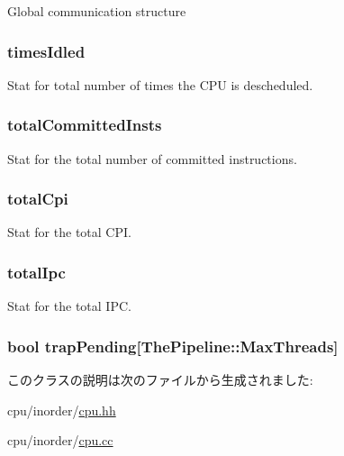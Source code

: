 \label{classInOrderCPU_ad72b6568a4a40f54d071c31bef16bf2e}
Global communication structure \hypertarget{classInOrderCPU_a174dbfb3c7b892914a54cec44ed2eeaf}{
\subsubsection[{timesIdled}]{ {\bf timesIdled}}}
\label{classInOrderCPU_a174dbfb3c7b892914a54cec44ed2eeaf}
Stat for total number of times the CPU is descheduled. \hypertarget{classInOrderCPU_aec59f0599a86f88751992e5825e25c22}{
\subsubsection[{totalCommittedInsts}]{ {\bf totalCommittedInsts}}}
\label{classInOrderCPU_aec59f0599a86f88751992e5825e25c22}
Stat for the total number of committed instructions. \hypertarget{classInOrderCPU_a5bd2f06c271dd03138cad92251716f5d}{
\subsubsection[{totalCpi}]{ {\bf totalCpi}}}
\label{classInOrderCPU_a5bd2f06c271dd03138cad92251716f5d}
Stat for the total CPI. \hypertarget{classInOrderCPU_ae8551f10097f4b2e5ed3febf0d9417e3}{
\subsubsection[{totalIpc}]{ {\bf totalIpc}}}
\label{classInOrderCPU_ae8551f10097f4b2e5ed3febf0d9417e3}
Stat for the total IPC. \hypertarget{classInOrderCPU_ab7c4ed509aab4ab66a4d1c212dab659c}{
\subsubsection[{trapPending}]{\setlength{\rightskip}{0pt plus 5cm}bool {\bf trapPending}\mbox{[}{\bf ThePipeline::MaxThreads}\mbox{]}}}
\label{classInOrderCPU_ab7c4ed509aab4ab66a4d1c212dab659c}


このクラスの説明は次のファイルから生成されました:\begin{DoxyCompactItemize}
\item 
cpu/inorder/\hyperlink{inorder_2cpu_8hh}{cpu.hh}\item 
cpu/inorder/\hyperlink{inorder_2cpu_8cc}{cpu.cc}\end{DoxyCompactItemize}
